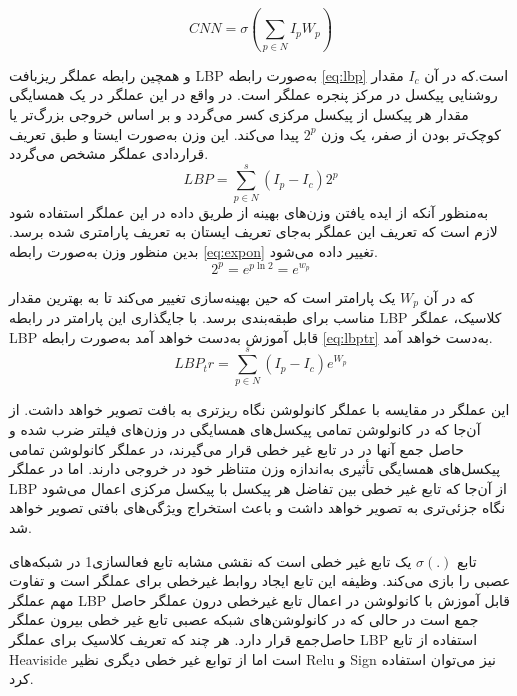 \begin{equation}\label{eq:cnn}
	CNN=\sigma(\sum_{p\in N}I_pW_p)
\end{equation}

و همچین رابطه عملگر ریزبافت LBP به‌صورت رابطه
\ref{eq:lbp}
 است.که در آن
$I_c$
   مقدار روشنایی پیکسل در مرکز پنجره عملگر است. در واقع در این عملگر در یک همسایگی مقدار هر پیکسل از پیکسل مرکزی کسر می‌گردد و بر اساس خروجی بزرگ‌تر یا کوچک‌تر بودن از صفر، یک وزن  
$2^p$   
   پیدا می‌کند. این وزن به‌صورت ایستا و طبق تعریف قراردادی عملگر مشخص می‌گردد.
\begin{equation}\label{eq:lbp}
	LBP=\sum_{p\in N}^s(I_p-I_c)2^p 
\end{equation}
به‌منظور آنکه از ایده یافتن وزن‌های بهینه از طریق داده در این عملگر استفاده شود لازم است که تعریف این عملگر به‌جای تعریف ایستان به تعریف پارامتری شده برسد. بدین منظور وزن  به‌صورت رابطه
\ref{eq:expon}
 تغییر داده می‌شود.
\begin{equation}\label{eq:expon}
	2^p=e^{p\ln{2}}= e^{w_p}
\end{equation}

که در آن 
$W_p$
 یک پارامتر است که حین بهینه‌سازی تغییر می‌کند تا به بهترین مقدار مناسب برای طبقه‌بندی برسد. با جایگذاری این پارامتر در رابطه LBP کلاسیک، عملگر LBP قابل آموزش به‌دست خواهد آمد به‌صورت رابطه
\ref{eq:lbptr}
به‌دست خواهد آمد.
\begin{equation}\label{eq:lbptr}
		LBP_tr=\sum_{p\in N}^s(I_p-I_c)e^{W_p} 
\end{equation}

این عملگر در مقایسه با عملگر کانولوشن نگاه ریزتری به بافت تصویر خواهد داشت. از آن‌جا که در کانولوشن تمامی پیکسل‌های همسایگی در وزن‌های فیلتر ضرب شده و حاصل جمع آنها در در تابع غیر خطی قرار می‌گیرند، در عملگر کانولوشن تمامی پیکسل‌های همسایگی تأثیری به‌اندازه وزن متناظر خود در خروجی دارند. اما در عملگر LBP از آن‌جا که تابع غیر خطی بین تفاضل هر پیکسل با پیکسل مرکزی اعمال می‌شود نگاه جزئی‌تری به تصویر خواهد داشت و باعث استخراج ویژگی‌های بافتی تصویر خواهد شد. 

تابع 
$\sigma(.)$
 یک تابع غیر خطی است که نقشی مشابه تابع فعالسازی1 در شبکه‌های عصبی را بازی می‌کند. وظیفه این تابع ایجاد روابط غیرخطی برای عملگر است و تفاوت مهم عملگر LBP قابل آموزش با کانولوشن در اعمال تابع غیرخطی درون عملگر حاصل جمع است در حالی که در کانولوشن‌های شبکه عصبی تابع غیر خطی بیرون عملگر حاصل‌جمع قرار دارد. هر چند که تعریف کلاسیک برای عملگر LBP استفاده از تابع Heaviside است اما از توابع غیر خطی دیگری نظیر Relu و Sign نیز می‌توان استفاده کرد.
 
